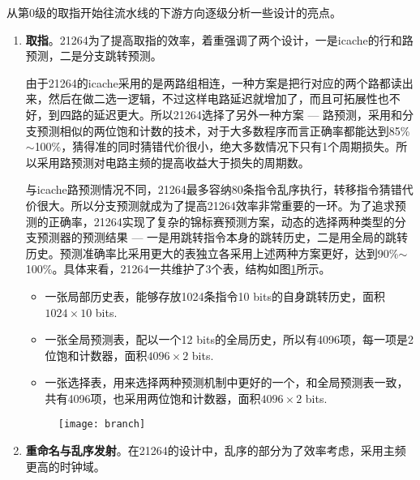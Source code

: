 从第0级的取指开始往流水线的下游方向逐级分析一些设计的亮点。
\begin{enumerate}[label=(\alph*)]
	\item \textbf{取指}。21264为了提高取指的效率，着重强调了两个设计，一是icache的行和路预测，二是分支跳转预测。
	
	由于21264的icache采用的是两路组相连，一种方案是把行对应的两个路都读出来，然后在做二选一逻辑，不过这样电路延迟就增加了，而且可拓展性也不好，到四路的延迟更大。所以21264选择了另外一种方案 --- 路预测，采用和分支预测相似的两位饱和计数的技术，对于大多数程序而言正确率都能达到85\%$ \sim $100\%，猜得准的同时猜错代价很小，绝大多数情况下只有1个周期\citep{Alpha21264}损失。所以采用路预测对电路主频的提高收益大于损失的周期数。
	
	与icache路预测情况不同，21264最多容纳80条指令乱序执行，转移指令猜错代价很大。所以分支预测就成为了提高21264效率非常重要的一环。为了追求预测的正确率，21264实现了复杂的锦标赛预测方案，动态的选择两种类型的分支预测器的预测结果 --- 一是用跳转指令本身的跳转历史，二是用全局的跳转历史。预测准确率比采用更大的表独立各采用上述两种方案更好，达到90\%$ \sim $100\%\citep{Alpha21264}。具体来看，21264一共维护了3个表，结构如图\ref{fig:branch_21264}所示。
	\begin{itemize}
		\item 一张局部历史表，能够存放1024条指令10 bits的自身跳转历史，面积$ 1024\times 10 $ bits.
		\item 一张全局预测表，配以一个12 bits的全局历史，所以有4096项，每一项是2位饱和计数器，面积$ 4096\times 2 $ bits.
		\item 一张选择表，用来选择两种预测机制中更好的一个，和全局预测表一致，共有4096项，也采用两位饱和计数器，面积$ 4096\times 2 $ bits.
	\end{itemize}
	\begin{figure}[!htbp]
		\centering
		\texttt{[image: branch]}
		\label{fig:branch_21264}
	\end{figure}
	\item \textbf{重命名与乱序发射}。在21264的设计中，乱序的部分为了效率考虑，采用主频更高的时钟域。
	

\end{enumerate}
